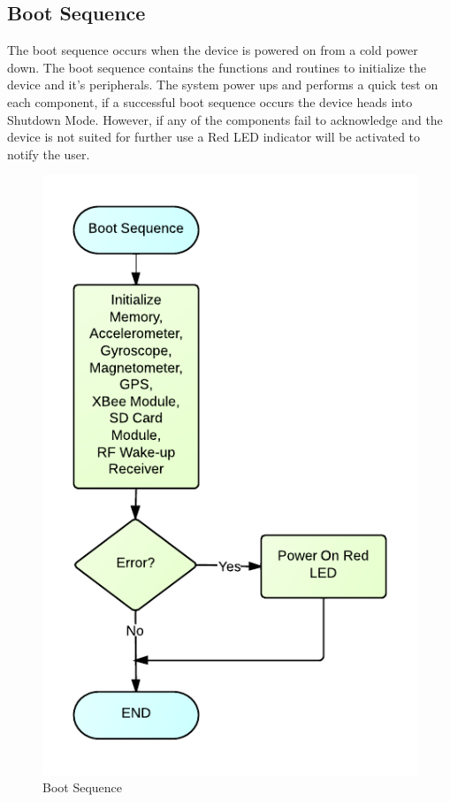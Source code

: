 \subsection{Boot Sequence}
The boot sequence occurs when the device is powered on from a cold power down. The boot sequence contains the functions and routines to initialize the device and it's peripherals. The system power ups and performs a quick test on each component, if a successful boot sequence occurs the device heads into Shutdown Mode. However, if any of the components fail to acknowledge and the device is not suited for further use a Red LED indicator will be activated to notify the user.
\begin{figure}[H]
	\centering
	\includegraphics[scale=1.0]{img/BootSequenceFlowchart}
	\caption{Boot Sequence \label{fig:bootSequence}}
\end{figure}

